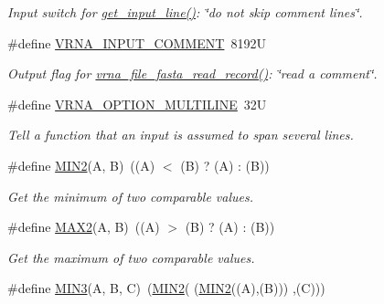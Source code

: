 \begin{DoxyCompactItemize}
\begin{DoxyCompactList}\small\item\em Input switch for \hyperlink{group__utils_ga8ef1835eb83f542396f59f0b205965e5}{get\-\_\-input\-\_\-line()}\-: {\itshape \char`\"{}do not skip comment lines\char`\"{}}. \end{DoxyCompactList}\item 
\hypertarget{group__utils_gaf2062e0eeefffd3ed639af460b3d4fab}{\#define \hyperlink{group__utils_gaf2062e0eeefffd3ed639af460b3d4fab}{V\-R\-N\-A\-\_\-\-I\-N\-P\-U\-T\-\_\-\-C\-O\-M\-M\-E\-N\-T}~8192\-U}\label{group__utils_gaf2062e0eeefffd3ed639af460b3d4fab}

\begin{DoxyCompactList}\small\item\em Output flag for \hyperlink{group__file__utils_ga8cfb7e271efc9e1f34640acb85475639}{vrna\-\_\-file\-\_\-fasta\-\_\-read\-\_\-record()}\-: {\itshape \char`\"{}read a comment\char`\"{}}. \end{DoxyCompactList}\item 
\#define \hyperlink{group__utils_gabec89c09874528c6cb73140a4c3d86d7}{V\-R\-N\-A\-\_\-\-O\-P\-T\-I\-O\-N\-\_\-\-M\-U\-L\-T\-I\-L\-I\-N\-E}~32\-U
\begin{DoxyCompactList}\small\item\em Tell a function that an input is assumed to span several lines. \end{DoxyCompactList}\item 
\hypertarget{group__utils_gae0b9cd0ce090bd69b951aa73e8fa4f7d}{\#define \hyperlink{group__utils_gae0b9cd0ce090bd69b951aa73e8fa4f7d}{M\-I\-N2}(A, B)~((A) $<$ (B) ? (A) \-: (B))}\label{group__utils_gae0b9cd0ce090bd69b951aa73e8fa4f7d}

\begin{DoxyCompactList}\small\item\em Get the minimum of two comparable values. \end{DoxyCompactList}\item 
\hypertarget{group__utils_ga33297b3679c713b0c4d897cd0fe3b122}{\#define \hyperlink{group__utils_ga33297b3679c713b0c4d897cd0fe3b122}{M\-A\-X2}(A, B)~((A) $>$ (B) ? (A) \-: (B))}\label{group__utils_ga33297b3679c713b0c4d897cd0fe3b122}

\begin{DoxyCompactList}\small\item\em Get the maximum of two comparable values. \end{DoxyCompactList}\item 
\hypertarget{group__utils_ga721b8d5f3abef17f10293f1f7f8c958e}{\#define \hyperlink{group__utils_ga721b8d5f3abef17f10293f1f7f8c958e}{M\-I\-N3}(A, B, C)~(\hyperlink{group__utils_gae0b9cd0ce090bd69b951aa73e8fa4f7d}{M\-I\-N2}(  (\hyperlink{group__utils_gae0b9cd0ce090bd69b951aa73e8fa4f7d}{M\-I\-N2}((A),(B))) ,(C)))}\label{group__utils_ga721b8d5f3abef17f10293f1f7f8c958e}


\end{DoxyCompactItemize}
